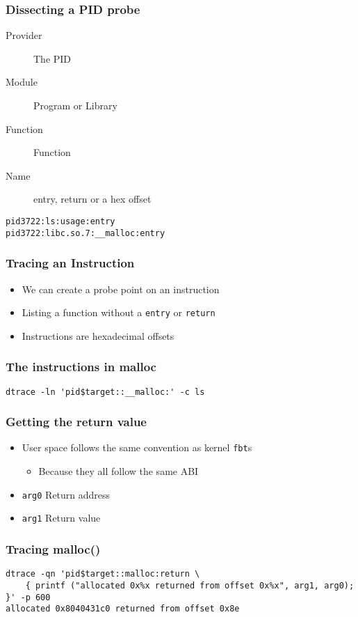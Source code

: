 \documentclass[pdftex]{beamer}
\begin{document}
\begin{frame}[fragile]
  \frametitle{Dissecting a PID probe}
  \begin{description}
  \item[Provider] The PID
  \item[Module] Program or Library
  \item[Function] Function
  \item[Name] entry, return or a hex offset
  \end{description}
\begin{verbatim}
pid3722:ls:usage:entry  
pid3722:libc.so.7:__malloc:entry
\end{verbatim}
\end{frame}

\begin{frame}[fragile]
  \frametitle{Tracing an Instruction}
  \begin{itemize}
  \item We can create a probe point on an instruction
  \item Listing a function without a \verb+entry+ or \verb+return+
  \item Instructions are hexadecimal offsets
  \end{itemize}
\end{frame}

\begin{frame}[fragile]
  \frametitle{The instructions in malloc}
\begin{lstlisting}
dtrace -ln 'pid$target::__malloc:' -c ls
\end{lstlisting}
\end{frame}

\begin{frame}[fragile]
  \frametitle{Getting the return value}
  \begin{itemize}
  \item User space follows the same convention as kernel \verb+fbt+s
    \begin{itemize}
    \item Because they all follow the same ABI
    \end{itemize}
  \item \verb+arg0+ Return address
  \item \verb+arg1+ Return value
  \end{itemize}
\end{frame}

\begin{frame}[fragile]
  \frametitle{Tracing malloc()}
\begin{lstlisting}
dtrace -qn 'pid$target::malloc:return \
    { printf ("allocated 0x%x returned from offset 0x%x", arg1, arg0); }' -p 600
allocated 0x8040431c0 returned from offset 0x8e
\end{lstlisting}
\end{frame}
\end{document}

